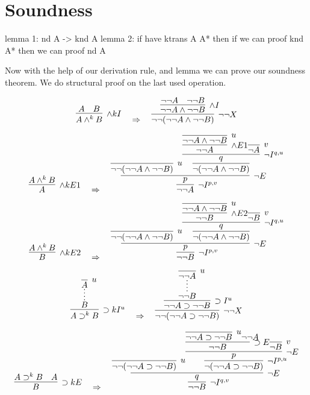 \documentclass{article}
\begin{document}
\section{Soundness}
lemma 1: nd A -> knd A
lemma 2: if have ktrans A A* then if we can proof knd A* then we can proof nd A

Now with the help of our derivation rule, and lemma we can prove our soundness theorem. We do structural proof on the last used operation.

\vspace{3em}
\[
\infer[\land kI]{A \land^k B}{A & B}
\quad \Rightarrow \quad
\infer[\neg\neg X]{\neg\neg(\neg\neg A \land \neg\neg B)}{
    \infer[\land I]{\neg\neg A \land \neg\neg B}{
      \neg\neg A & \neg\neg B
    }
}
\]

\vspace{3em}
\[
\infer[\land kE1]{A}{
  A \land^k B
}
\quad \Rightarrow \quad
\infer[\neg I^{p,v}]{ \neg \neg A}{ 
  \infer[\neg E]{ p}{
    \infer[u]{
        \neg \neg (\neg \neg A \land \neg \neg B)
     }{}
     \infer[]{
        \neg (\neg \neg A \land \neg \neg B)
     }{
        \infer[\neg I^{q,u}]{ q}{
            \infer[\land E1]{\neg \neg A }{
                \infer[u]{\neg \neg A \land \neg \neg B}{}
            }
            \infer[v]{\neg A}{}
        }
     }
  }
}
\]

\vspace{3em}
\[
\infer[\land kE2]{B}{
  A \land^k B
}
\quad \Rightarrow \quad
\infer[\neg I^{p,v}]{\neg \neg B}{ 
  \infer[\neg E]{p}{
    \infer[u]{
        \neg \neg (\neg \neg A \land \neg \neg B)
     }{}
     \infer[]{
        \neg (\neg \neg A \land \neg \neg B)
     }{
        \infer[\neg I^{q,u}]{ q}{
            \infer[\land E2]{\neg \neg B }{
                \infer[u]{\neg \neg A \land \neg \neg B}{}
            }
            \infer[v]{\neg B}{}
        }
     }
  }
}
\]

\vspace{3em}
\[
\infer[\supset k I^u]{A \supset^k B}{
  \infer*[]{B}{
    \infer[u]{A}{}
  }
}
\quad \Rightarrow \quad
\infer[\neg \neg X ] {\neg \neg(\neg \neg A \supset \neg \neg B )}{
\infer[\supset  I^u]{\neg \neg A \supset \neg \neg B}{
  \infer*[]{\neg \neg B}{
    \infer[u]{\neg \neg A}{}
  }
}
}
\]

\vspace{3em}
\[
\infer[\supset kE]{B}{
    A \supset^k B & A
}
\quad \Rightarrow \quad
\infer[\neg I^{q,v}] {\neg \neg B }{
\infer[\neg E]{q}{
    \infer[u]{\neg \neg(\neg \neg A \supset \neg \neg B )}{}
    \infer[\neg I^{p,u}]{\neg(\neg \neg A \supset \neg \neg B )}{
        \infer[\neg E]{p}{
            \infer[\supset E]{\neg \neg B}{
                \infer[u]{\neg \neg A \supset \neg \neg B}{}
                {\neg \neg A}
            }
            \infer[v]{\neg B}{}
        }
    }
}
}
\]
\end{document}
